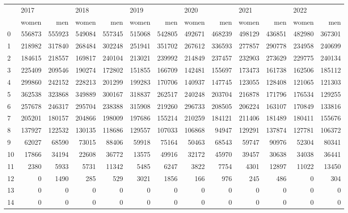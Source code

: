 \begin{tabular}{lrrrrrrrrrrrr}
\toprule
{} & \multicolumn{2}{l}{2017} & \multicolumn{2}{l}{2018} & \multicolumn{2}{l}{2019} & \multicolumn{2}{l}{2020} & \multicolumn{2}{l}{2021} & \multicolumn{2}{l}{2022} \\
{} &   women &     men &   women &     men &   women &     men &   women &     men &   women &     men &   women &     men \\
\midrule
0  &  556873 &  555923 &  549084 &  557345 &  515068 &  542805 &  492671 &  468239 &  498129 &  436851 &  482980 &  367301 \\
1  &  218982 &  317840 &  268484 &  302248 &  251941 &  351702 &  267612 &  336593 &  277857 &  290778 &  234958 &  240699 \\
2  &  184615 &  218557 &  169817 &  240104 &  213021 &  239992 &  214849 &  237457 &  232903 &  273629 &  229775 &  240134 \\
3  &  225409 &  209546 &  190274 &  172802 &  151855 &  166709 &  142481 &  155697 &  173473 &  161738 &  162506 &  185112 \\
4  &  299860 &  242152 &  228213 &  201299 &  199283 &  170706 &  140937 &  147745 &  123055 &  128408 &  121065 &  121303 \\
5  &  362538 &  323868 &  349889 &  300167 &  318837 &  262517 &  240248 &  203704 &  216878 &  171796 &  176534 &  129255 \\
6  &  257678 &  246317 &  295704 &  238388 &  315908 &  219260 &  296733 &  208505 &  206224 &  163107 &  170849 &  133816 \\
7  &  205201 &  180157 &  204866 &  198009 &  197686 &  155214 &  210259 &  184121 &  211406 &  181489 &  180411 &  155676 \\
8  &  137927 &  122532 &  130135 &  118686 &  129557 &  107033 &  106868 &   94947 &  129291 &  137874 &  127781 &  106372 \\
9  &   62027 &   68590 &   73015 &   88406 &   59918 &   75164 &   50463 &   68543 &   59747 &   90976 &   52304 &   80341 \\
10 &   17866 &   34194 &   22608 &   36772 &   13575 &   49916 &   32172 &   45970 &   39457 &   30638 &   34038 &   36441 \\
11 &    2380 &    5933 &    5731 &   11342 &    5485 &    6247 &    3822 &    7754 &    4301 &   12897 &   11022 &   13450 \\
12 &       0 &    1490 &     285 &     529 &    3021 &    1856 &     166 &     976 &     245 &     486 &       0 &     304 \\
13 &       0 &       0 &       0 &       0 &       0 &       0 &       0 &       0 &       0 &       0 &       0 &       0 \\
14 &       0 &       0 &       0 &       0 &       0 &       0 &       0 &       0 &       0 &       0 &       0 &       0 \\
\bottomrule
\end{tabular}
